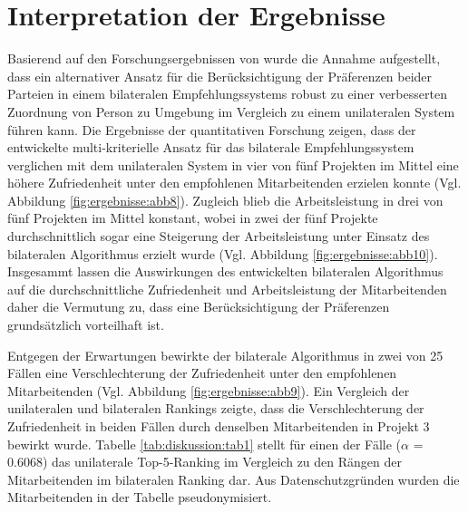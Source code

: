 \section{Interpretation der Ergebnisse}
Basierend auf den Forschungsergebnissen von \textcite[S.1 ff.]{link:booklet} wurde die Annahme aufgestellt, dass ein alternativer Ansatz für die Berücksichtigung der Präferenzen beider Parteien in einem bilateralen Empfehlungssystems robust zu einer verbesserten Zuordnung von Person zu Umgebung im Vergleich zu einem unilateralen System führen kann.
Die Ergebnisse der quantitativen Forschung zeigen, dass der entwickelte multi-kriterielle Ansatz für das bilaterale Empfehlungssystem verglichen mit dem unilateralen System in vier von fünf Projekten im Mittel eine höhere Zufriedenheit unter den empfohlenen Mitarbeitenden erzielen konnte (Vgl. Abbildung \ref{fig:ergebnisse:abb8}).
Zugleich blieb die Arbeitsleistung in drei von fünf Projekten im Mittel konstant, wobei in zwei der fünf Projekte durchschnittlich sogar eine Steigerung der Arbeitsleistung unter Einsatz des bilateralen Algorithmus erzielt wurde (Vgl. Abbildung \ref{fig:ergebnisse:abb10}).
Insgesammt lassen die Auswirkungen des entwickelten bilateralen Algorithmus auf die durchschnittliche Zufriedenheit und Arbeitsleistung der Mitarbeitenden daher die Vermutung zu, dass eine Berücksichtigung der Präferenzen grundsätzlich vorteilhaft ist.

Entgegen der Erwartungen bewirkte der bilaterale Algorithmus in zwei von 25 Fällen eine Verschlechterung der Zufriedenheit unter den empfohlenen Mitarbeitenden (Vgl. Abbildung \ref{fig:ergebnisse:abb9}).
Ein Vergleich der unilateralen und bilateralen Rankings zeigte, dass die Verschlechterung der Zufriedenheit in beiden Fällen durch denselben Mitarbeitenden in Projekt 3 bewirkt wurde.
Tabelle \ref{tab:diskussion:tab1} stellt für einen der Fälle ($\alpha$ = 0.6068) das unilaterale Top-5-Ranking im Vergleich zu den Rängen der Mitarbeitenden im bilateralen Ranking dar.
Aus Datenschutzgründen wurden die Mitarbeitenden in der Tabelle pseudonymisiert.

